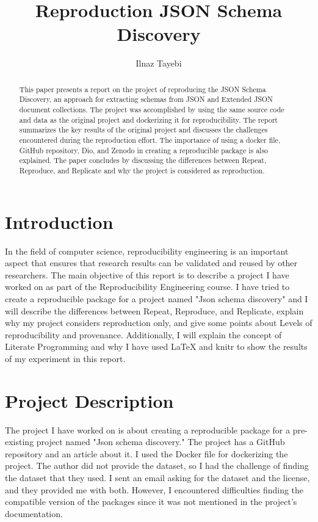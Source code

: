 \documentclass[manuscript,screen,review]{acmart}
\begin{document}
\title{Reproduction JSON Schema Discovery}

\author{Ilnaz Tayebi}
\renewcommand{\shortauthors}{Tayebi, I.}

\maketitle

\begin{abstract}
This paper presents a report on the project of reproducing the JSON Schema Discovery, an approach for extracting schemas from JSON and Extended JSON document collections. The project was accomplished by using the same source code and data as the original project and dockerizing it for reproducibility. The report summarizes the key results of the original project and discusses the challenges encountered during the reproduction effort. The importance of using a docker file, GitHub repository, Dio, and Zenodo in creating a reproducible package is also explained. The paper concludes by discussing the differences between Repeat, Reproduce, and Replicate and why the project is considered as reproduction.
\end{abstract}
\section*{Introduction}
In the field of computer science, reproducibility engineering is an important aspect that ensures that research results can be validated and reused by other researchers. The main objective of this report is to describe a project I have worked on as part of the Reproducibility Engineering course. I have tried to create a reproducible package for a project named "Json schema discovery" and I will describe the differences between Repeat, Reproduce, and Replicate, explain why my project considers reproduction only, and give some points about Levels of reproducibility and provenance. Additionally, I will explain the concept of Literate Programming and why I have used LaTeX and knitr to show the results of my experiment in this report.

\section*{Project Description}
The project I have worked on is about creating a reproducible package for a pre-existing project named "Json schema discovery." The project has a GitHub repository and an article about it. I used the Docker file for dockerizing the project. The author did not provide the dataset, so I had the challenge of finding the dataset that they used. I sent an email asking for the dataset and the license, and they provided me with both. However, I encountered difficulties finding the compatible version of the packages since it was not mentioned in the project's documentation.
\end{document}
